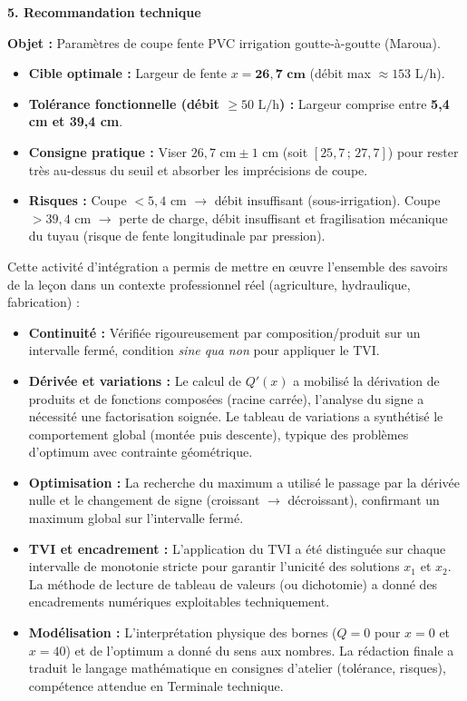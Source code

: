 \documentclass[11pt]{article}
\newcounter{popsec}
\newcounter{popsub}
\newcommand{\courssub}[1]{%
  \stepcounter{popsub}%
  \par\vspace{9pt}\noindent{\popxbold\fontsize{11.5}{13}\selectfont\color{popink}{\color{poporange}\thepopsec.\thepopsub}\hspace{6pt}#1}\par\nopagebreak\vspace{4pt}
}
\begin{document}
\begin{exoresolu}
\textbf{5. Recommandation technique}
\begin{aretenir}
\textbf{Objet :} Paramètres de coupe fente PVC irrigation goutte-à-goutte (Maroua).
\begin{itemize}
    \item \textbf{Cible optimale :} Largeur de fente $x = \mathbf{26,7 \text{ cm}}$ (débit max $\approx 153 \text{ L/h}$).
    \item \textbf{Tolérance fonctionnelle (débit $\ge 50 \text{ L/h}$) :} Largeur comprise entre \textbf{5,4 cm et 39,4 cm}.
    \item \textbf{Consigne pratique :} Viser $26,7 \text{ cm} \pm 1 \text{ cm}$ (soit $[25,7\,;\, 27,7]$) pour rester très au-dessus du seuil et absorber les imprécisions de coupe.
    \item \textbf{Risques :} Coupe $< 5,4 \text{ cm}$ $\to$ débit insuffisant (sous-irrigation). Coupe $> 39,4 \text{ cm}$ $\to$ perte de charge, débit insuffisant et fragilisation mécanique du tuyau (risque de fente longitudinale par pression).
\end{itemize}
\end{aretenir}
\end{exoresolu}

\courssub{Bilan de l'activité}
Cette activité d'intégration a permis de mettre en œuvre l'ensemble des savoirs de la leçon dans un contexte professionnel réel (agriculture, hydraulique, fabrication) :
\begin{itemize}
    \item \textbf{Continuité :} Vérifiée rigoureusement par composition/produit sur un intervalle fermé, condition \emph{sine qua non} pour appliquer le TVI.
    \item \textbf{Dérivée et variations :} Le calcul de $Q'(x)$ a mobilisé la dérivation de produits et de fonctions composées (racine carrée), l'analyse du signe a nécessité une factorisation soignée. Le tableau de variations a synthétisé le comportement global (montée puis descente), typique des problèmes d'optimum avec contrainte géométrique.
    \item \textbf{Optimisation :} La recherche du maximum a utilisé le passage par la dérivée nulle et le changement de signe (croissant $\to$ décroissant), confirmant un maximum global sur l'intervalle fermé.
    \item \textbf{TVI et encadrement :} L'application du TVI a été distinguée sur chaque intervalle de monotonie stricte pour garantir l'unicité des solutions $x_1$ et $x_2$. La méthode de lecture de tableau de valeurs (ou dichotomie) a donné des encadrements numériques exploitables techniquement.
    \item \textbf{Modélisation :} L'interprétation physique des bornes ($Q=0$ pour $x=0$ et $x=40$) et de l'optimum a donné du sens aux nombres. La rédaction finale a traduit le langage mathématique en consignes d'atelier (tolérance, risques), compétence attendue en Terminale technique.
\end{itemize}
\end{document}
